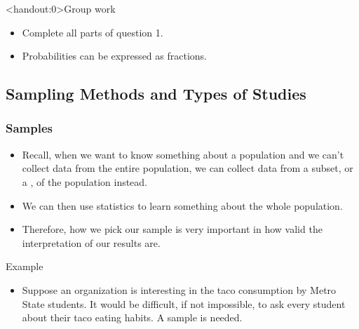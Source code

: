 \documentclass[xcolor=table, aspectratio=169, bigger]{beamer}
\begin{document}
\begin{frame}<handout:0>{Group work}
\begin{block}{}
\begin{itemize}
\item Complete all parts of question 1.
\item Probabilities can be expressed as fractions.
\end{itemize}
\end{block}
\end{frame}

\subsection{Sampling Methods and Types of Studies}

\begin{frame}
\frametitle{Samples}

\begin{block}{}
\begin{itemize}
\item Recall, when we want to know something about a population and we can't collect data from the entire population, we can collect data from a subset, or a , of the population instead.
\pause
\item We can then use statistics to learn something about the whole population.
\pause
\item Therefore, how we pick our sample is very important in how valid the interpretation of our results are.
\end{itemize}
\end{block}
\pause
\begin{exampleblock}{Example}
\begin{itemize}
\item Suppose an organization is interesting in the taco consumption by Metro State students. It would be difficult, if not impossible, to ask every student about their taco eating habits. A sample is needed.
\end{itemize}
\end{exampleblock}
\end{frame}
\end{document}

